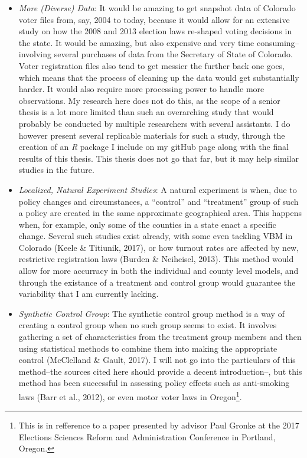 \documentclass[12pt,twoside]{reedthesis}
\begin{document}
  \begin{itemize}
  \item
    \emph{More (Diverse) Data}: It would be amazing to get snapshot data
    of Colorado voter files from, say, 2004 to today, because it would
    allow for an extensive study on how the 2008 and 2013 election laws
    re-shaped voting decisions in the state. It would be amazing, but also
    expensive and very time consuming--involving several purchases of data
    from the Secretary of State of Colorado. Voter registration files also
    tend to get messier the further back one goes, which means that the
    process of cleaning up the data would get substantially harder. It
    would also require more processing power to handle more observations.
    My research here does not do this, as the scope of a senior thesis is
    a lot more limited than such an overarching study that would probably
    be conducted by multiple researchers with several assistants. I do
    however present several replicable materials for such a study, through
    the creation of an \textit{R} package I include on my gitHub page
    along with the final results of this thesis. This thesis does not go
    that far, but it may help similar studies in the future.
  \item
    \emph{Localized, Natural Experiment Studies}: A natural experiment is
    when, due to policy changes and circumstances, a ``control'' and
    ``treatment'' group of such a policy are created in the same
    approximate geographical area. This happens when, for example, only
    some of the counties in a state enact a specific change. Several such
    studies exist already, with some even tackling VBM in Colorado (Keele
    \& Titiunik, 2017), or how turnout rates are affected by new,
    restrictive registration laws (Burden \& Neiheisel, 2013). This method
    would allow for more accurracy in both the individual and county level
    models, and through the existance of a treatment and control group
    would guarantee the variability that I am currently lacking.
  \item
    \emph{Synthetic Control Group}: The synthetic control group method is
    a way of creating a control group when no such group seems to exist.
    It involves gathering a set of characteristics from the treatment
    group members and then using statistical methods to combine them into
    making the appropriate control (McClelland \& Gault, 2017). I will not
    go into the particulars of this method--the sources cited here should
    provide a decent introduction--, but this method has been successful
    in assessing policy effects such as anti-smoking laws (Barr et al.,
    2012), or even motor voter laws in Oregon\footnote{This is in
      refference to a paper presented by advisor Paul Gronke at the 2017
      Elections Sciences Reform and Administration Conference in Portland,
      Oregon.}.
  \end{itemize}
  
\end{document}
